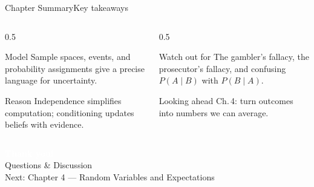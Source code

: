 \documentclass[aspectratio=169,11pt]{beamer}
\begin{document}
\begin{frame}{Chapter Summary}{Key takeaways}
  \begin{columns}[T]
    \begin{column}{0.5\textwidth}
      \begin{block}{Model}
        \small Sample spaces, events, and probability assignments give a
        precise language for uncertainty.
      \end{block}
      \begin{exampleblock}{Reason}
        \small Independence simplifies computation; conditioning updates
        beliefs with evidence.
      \end{exampleblock}
    \end{column}
    \begin{column}{0.5\textwidth}
      \begin{alertblock}{Watch out for}
        \small The gambler's fallacy, the prosecutor's fallacy, and
        confusing $P(A\mid B)$ with $P(B\mid A)$.
      \end{alertblock}
      \begin{block}{Looking ahead}
        \small Ch.\,4:  turn outcomes into
        numbers we can average.
      \end{block}
    \end{column}
  \end{columns}
\end{frame}

{
\begin{frame}
  \vfill
  \begin{center}
    {\LARGE\textcolor{white}{\textbf{Thank you!}}}\\[0.6em]
    {\small\textcolor{PrimaryLight}{Questions \& Discussion}}\\[1.2em]
    {\footnotesize\textcolor{AccentYellow}{Next: Chapter 4 — Random Variables and Expectations}}
  \end{center}
  \vfill
\end{frame}}
\end{document}

